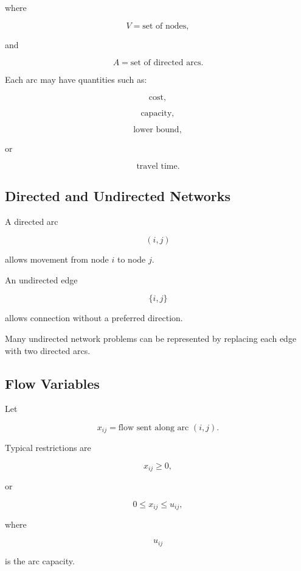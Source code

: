 where

\[
V
=
\text{set of nodes},
\]

and

\[
A
=
\text{set of directed arcs}.
\]

Each arc may have quantities such as:

\[
\boxed{
\text{cost},
}
\]

\[
\boxed{
\text{capacity},
}
\]

\[
\boxed{
\text{lower bound},
}
\]

or

\[
\boxed{
\text{travel time}.
}
\]

\subsection{Directed and Undirected Networks}
\label{subsec:directed-undirected-networks}

A directed arc

\[
(i,j)
\]

allows movement from node \(i\) to node \(j\).

An undirected edge

\[
\{i,j\}
\]

allows connection without a preferred direction.

Many undirected network problems can be represented by replacing each
edge with two directed arcs.

\subsection{Flow Variables}
\label{subsec:network-flow-variables}

Let

\[
\boxed{
x_{ij}
=
\text{flow sent along arc }(i,j).
}
\]

Typical restrictions are

\[
\boxed{
x_{ij}\geq0,
}
\]

or

\[
\boxed{
0\leq x_{ij}\leq u_{ij},
}
\]

where

\[
u_{ij}
\]

is the arc capacity.

